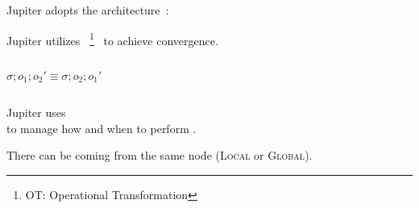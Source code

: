 
\begin{frame}{}
  \centerline{\Huge {}}
\end{frame}

\begin{frame}{}
  \centerline{\large Jupiter adopts the  architecture~:}

  \begin{center}
    \begin{minipage}{0.50\textwidth}
      
    \end{minipage}
  \end{center}

  \vspace{-1.00cm}
\end{frame}

\begin{frame}{}
  \begin{center}
    {\large Jupiter utilizes ~\footnote{OT: Operational Transformation}~ to achieve convergence.}
  \end{center}

  \begin{columns}[c]
      \[
	\sigma; o_1; o_2' \equiv \sigma; o_2; o_1'
      \]
  \end{columns}
\end{frame}

\begin{frame}{}
  \begin{center}
    {\large Jupiter uses ~ \\
    to manage how and when to perform .}
  \end{center}


  \pause
  \begin{center} 
    There can be  coming from the same node ({\textsc{\footnotesize Local}} or \textsc{\footnotesize Global}).
  \end{center}
\end{frame}

